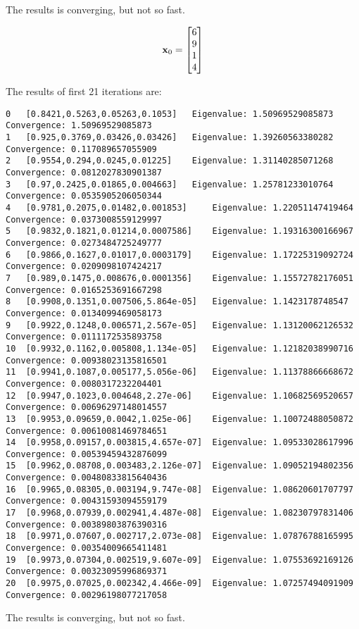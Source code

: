 \documentclass{article}
\begin{document}
\begin{enumerate}
The results is converging, but not so fast.  

\begin{align}
\boldsymbol{\mathrm{x}}_0=\begin{bmatrix} 6 \\ 9 \\ 1\\ 4 \end{bmatrix}
\end{align}

The results of first 21 iterations are: 
\begin{verbatim}
0	[0.8421,0.5263,0.05263,0.1053]	 Eigenvalue: 1.50969529085873	 Convergence: 1.50969529085873
1	[0.925,0.3769,0.03426,0.03426]	 Eigenvalue: 1.39260563380282	 Convergence: 0.117089657055909
2	[0.9554,0.294,0.0245,0.01225]	 Eigenvalue: 1.31140285071268	 Convergence: 0.0812027830901387
3	[0.97,0.2425,0.01865,0.004663]	 Eigenvalue: 1.25781233010764	 Convergence: 0.0535905206050344
4	[0.9781,0.2075,0.01482,0.001853]	 Eigenvalue: 1.22051147419464	 Convergence: 0.0373008559129997
5	[0.9832,0.1821,0.01214,0.0007586]	 Eigenvalue: 1.19316300166967	 Convergence: 0.0273484725249777
6	[0.9866,0.1627,0.01017,0.0003179]	 Eigenvalue: 1.17225319092724	 Convergence: 0.0209098107424217
7	[0.989,0.1475,0.008676,0.0001356]	 Eigenvalue: 1.15572782176051	 Convergence: 0.0165253691667298
8	[0.9908,0.1351,0.007506,5.864e-05]	 Eigenvalue: 1.1423178748547	 Convergence: 0.0134099469058173
9	[0.9922,0.1248,0.006571,2.567e-05]	 Eigenvalue: 1.13120062126532	 Convergence: 0.0111172535893758
10	[0.9932,0.1162,0.005808,1.134e-05]	 Eigenvalue: 1.12182038990716	 Convergence: 0.00938023135816501
11	[0.9941,0.1087,0.005177,5.056e-06]	 Eigenvalue: 1.11378866668672	 Convergence: 0.0080317232204401
12	[0.9947,0.1023,0.004648,2.27e-06]	 Eigenvalue: 1.10682569520657	 Convergence: 0.00696297148014557
13	[0.9953,0.09659,0.0042,1.025e-06]	 Eigenvalue: 1.10072488050872	 Convergence: 0.00610081469784651
14	[0.9958,0.09157,0.003815,4.657e-07]	 Eigenvalue: 1.09533028617996	 Convergence: 0.00539459432876099
15	[0.9962,0.08708,0.003483,2.126e-07]	 Eigenvalue: 1.09052194802356	 Convergence: 0.00480833815640436
16	[0.9965,0.08305,0.003194,9.747e-08]	 Eigenvalue: 1.08620601707797	 Convergence: 0.00431593094559179
17	[0.9968,0.07939,0.002941,4.487e-08]	 Eigenvalue: 1.08230797831406	 Convergence: 0.00389803876390316
18	[0.9971,0.07607,0.002717,2.073e-08]	 Eigenvalue: 1.07876788165995	 Convergence: 0.00354009665411481
19	[0.9973,0.07304,0.002519,9.607e-09]	 Eigenvalue: 1.07553692169126	 Convergence: 0.00323095996869371
20	[0.9975,0.07025,0.002342,4.466e-09]	 Eigenvalue: 1.07257494091909	 Convergence: 0.00296198077217058
\end{verbatim} 
The results is converging, but not so fast.  
\end{enumerate} 
\end{document}
